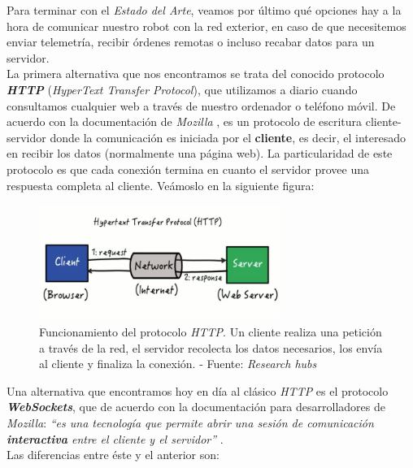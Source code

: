 Para terminar con el \textit{Estado del Arte}, veamos por último qué opciones hay a la hora de comunicar nuestro robot con la red exterior, en caso de que necesitemos enviar telemetría, recibir órdenes remotas o incluso recabar datos para un servidor.\\

La primera alternativa que nos encontramos se trata del conocido protocolo \textbf{\textit{HTTP}} (\textit{HyperText Transfer Protocol}), que utilizamos a diario cuando consultamos cualquier web a través de nuestro ordenador o teléfono móvil. De acuerdo con la documentación de \textit{Mozilla} \cite{http_protocol}, es un protocolo de escritura cliente-servidor donde la comunicación es iniciada por el \textbf{cliente}, es decir, el interesado en recibir los datos (normalmente una página web). La particularidad de este protocolo es que cada conexión termina en cuanto el servidor provee una respuesta completa al cliente. Veámoslo en la siguiente figura:

\begin{figure}[h]
	\centering
	\includegraphics[width=0.7\textwidth]{imagenes/http.png}
	\caption{Funcionamiento del protocolo \textit{HTTP}. Un cliente realiza una petición a través de la red, el servidor recolecta los datos necesarios, los envía al cliente y finaliza la conexión. - Fuente: \textit{Research hubs} \cite{http-image}}
	\label{http-img}
\end{figure}

Una alternativa que encontramos hoy en día al clásico \textit{HTTP} es el protocolo \textbf{\textit{WebSockets}}, que de acuerdo con la documentación para desarrolladores de \textit{Mozilla}: \textit{``es una tecnología que permite abrir una sesión de comunicación \textbf{interactiva} entre el cliente y el servidor''} \cite{ws_protocol}.\\

Las diferencias entre éste y el anterior son:

